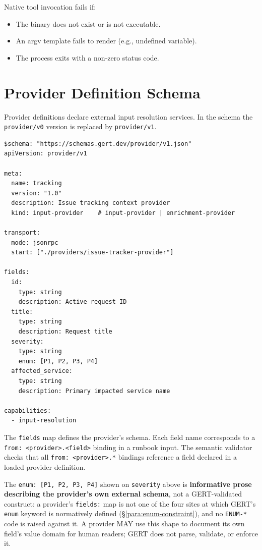 Native tool invocation fails if:
\begin{itemize}
  \item The binary does not exist or is not executable.
  \item An argv template fails to render (e.g., undefined variable).
  \item The process exits with a non-zero status code.
\end{itemize}

\section{Provider Definition Schema}
\label{sec:provider-schema}

Provider definitions declare external input resolution services.
In the schema the \texttt{provider/v0} version is replaced by \texttt{provider/v1}.

\begin{verbatim}
$schema: "https://schemas.gert.dev/provider/v1.json"
apiVersion: provider/v1

meta:
  name: tracking
  version: "1.0"
  description: Issue tracking context provider
  kind: input-provider    # input-provider | enrichment-provider

transport:
  mode: jsonrpc
  start: ["./providers/issue-tracker-provider"]

fields:
  id:
    type: string
    description: Active request ID
  title:
    type: string
    description: Request title
  severity:
    type: string
    enum: [P1, P2, P3, P4]
  affected_service:
    type: string
    description: Primary impacted service name

capabilities:
  - input-resolution
\end{verbatim}

The \texttt{fields} map defines the provider's schema.  Each field name
corresponds to a \texttt{from: <provider>.<field>} binding in a runbook input.
The semantic validator checks that all \texttt{from: <provider>.*} bindings
reference a field declared in a loaded provider definition.

The \texttt{enum: [P1, P2, P3, P4]} shown on \texttt{severity} above is
\textbf{informative prose describing the provider's own external schema}, not
a GERT-validated construct: a provider's \texttt{fields:} map is not one of
the four sites at which GERT's \texttt{enum} keyword is normatively defined
(\S\ref{para:enum-constraint}), and no \texttt{ENUM-*} code is raised against
it. A provider MAY use this shape to document its own field's value domain
for human readers; GERT does not parse, validate, or enforce it.

